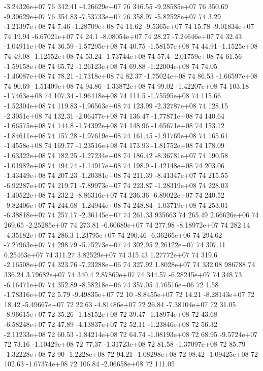 -3.24326e+07 76 342.41
-4.26629e+07 76 346.55
-9.28585e+07 76 350.69
-9.30629e+07 76 354.83
-7.53733e+07 76 358.97
-5.82528e+07 74 3.29
-1.21397e+08 74 7.46
-1.28709e+08 74 11.62
-9.5365e+07 74 15.78
-9.01834e+07 74 19.94
-6.67021e+07 74 24.1
-8.08054e+07 74 28.27
-7.24646e+07 74 32.43
-1.04911e+08 74 36.59
-1.57295e+08 74 40.75
-1.58157e+08 74 44.91
-1.1525e+08 74 49.08
-1.12552e+08 74 53.24
-1.73744e+08 74 57.4
-2.01759e+08 74 61.56
-1.59158e+08 74 65.72
-1.26123e+08 74 69.88
-1.22004e+08 74 74.05
-1.46087e+08 74 78.21
-1.7318e+08 74 82.37
-1.75024e+08 74 86.53
-1.66597e+08 74 90.69
-1.51409e+08 74 94.86
-1.33872e+08 74 99.02
-1.42207e+08 74 103.18
-1.7463e+08 74 107.34
-1.96418e+08 74 111.5
-1.75595e+08 74 115.66
-1.52304e+08 74 119.83
-1.96563e+08 74 123.99
-2.32787e+08 74 128.15
-2.3051e+08 74 132.31
-2.06477e+08 74 136.47
-1.77871e+08 74 140.64
-1.66575e+08 74 144.8
-1.74392e+08 74 148.96
-1.65671e+08 74 153.12
-1.84611e+08 74 157.28
-1.97619e+08 74 161.45
-1.91769e+08 74 165.61
-1.4558e+08 74 169.77
-1.23516e+08 74 173.93
-1.81752e+08 74 178.09
-1.63322e+08 74 182.25
-1.27234e+08 74 186.42
-8.36781e+07 74 190.58
-1.01982e+08 74 194.74
-1.14917e+08 74 198.9
-1.42148e+08 74 203.06
-1.43449e+08 74 207.23
-1.20381e+08 74 211.39
-8.41347e+07 74 215.55
-6.92287e+07 74 219.71
-7.89973e+07 74 223.87
-1.28319e+08 74 228.03
-1.40522e+08 74 232.2
-8.86316e+07 74 236.36
-6.89022e+07 74 240.52
-9.82406e+07 74 244.68
-1.24944e+08 74 248.84
-1.03719e+08 74 253.01
-6.38818e+07 74 257.17
-2.36145e+07 74 261.33
935663 74 265.49
2.66626e+06 74 269.65
-2.25285e+07 74 273.81
-6.60689e+07 74 277.98
-8.18972e+07 74 282.14
-4.35182e+07 74 286.3
1.23795e+07 74 290.46
-6.36265e+06 74 294.62
-7.27963e+07 74 298.79
-5.75273e+07 74 302.95
2.26122e+07 74 307.11
6.25463e+07 74 311.27
3.82529e+07 74 315.43
1.27772e+07 74 319.6
-2.16508e+07 74 323.76
-7.23288e+06 74 327.92
1.8028e+07 74 332.08
986788 74 336.24
3.79682e+07 74 340.4
2.87869e+07 74 344.57
-6.28245e+07 74 348.73
-6.16471e+07 74 352.89
-8.58218e+06 74 357.05
4.76516e+06 72 1.58
-1.78316e+07 72 5.79
-9.49835e+07 72 10
-8.8455e+07 72 14.21
-8.28143e+07 72 18.42
-5.49667e+07 72 22.63
-4.81486e+07 72 26.84
-7.38104e+07 72 31.05
-8.96615e+07 72 35.26
-1.18152e+08 72 39.47
-1.18974e+08 72 43.68
-6.58248e+07 72 47.89
-4.13837e+07 72 52.11
-1.23846e+08 72 56.32
-2.11233e+08 72 60.53
-1.84214e+08 72 64.74
-1.08193e+08 72 68.95
-9.5724e+07 72 73.16
-1.10429e+08 72 77.37
-1.31723e+08 72 81.58
-1.37097e+08 72 85.79
-1.32228e+08 72 90
-1.2228e+08 72 94.21
-1.08298e+08 72 98.42
-1.09425e+08 72 102.63
-1.67374e+08 72 106.84
-2.06658e+08 72 111.05
